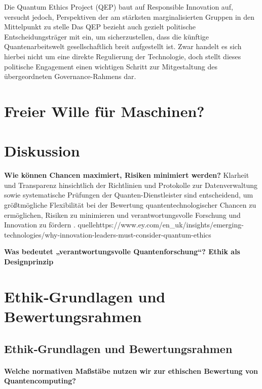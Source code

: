{    Die Quantum Ethics Project (QEP) baut auf Responsible Innovation auf, versucht jedoch, Perspektiven der am stärksten marginalisierten Gruppen in den Mittelpunkt zu stelle \cite{1-s2.0-S0370157324001078}
    Das QEP bezieht auch gezielt politische Entscheidungsträger mit ein, um sicherzustellen, dass die künftige Quantenarbeitswelt gesellschaftlich breit aufgestellt ist. Zwar handelt es sich hierbei nicht um eine direkte Regulierung der Technologie, doch stellt dieses politische Engagement einen wichtigen Schritt zur Mitgestaltung des übergeordneten Governance-Rahmens dar. \cite{1-s2.0-S0370157324001078}


\section{Freier Wille für Maschinen?}



\section{Diskussion}

\textbf{Wie können Chancen maximiert, Risiken minimiert werden?}
Klarheit und Transparenz hinsichtlich der Richtlinien und Protokolle zur Datenverwaltung sowie systematische Prüfungen der Quanten-Dienstleister sind entscheidend, um größtmögliche Flexibilität bei der Bewertung quantentechnologischer Chancen zu ermöglichen, Risiken zu minimieren und verantwortungsvolle Forschung und Innovation zu fördern .
quelle{https://www.ey.com/en_uk/insights/emerging-technologies/why-innovation-leaders-must-consider-quantum-ethics}


\textbf{Was bedeutet „verantwortungsvolle Quantenforschung“?
Ethik als Designprinzip}





\section{Ethik‑Grundlagen und Bewertungsrahmen}

\subsection{Ethik‑Grundlagen und Bewertungsrahmen}
\paragraph{Welche normativen Maßstäbe nutzen wir zur ethischen Bewertung von Quantencomputing?}

}
